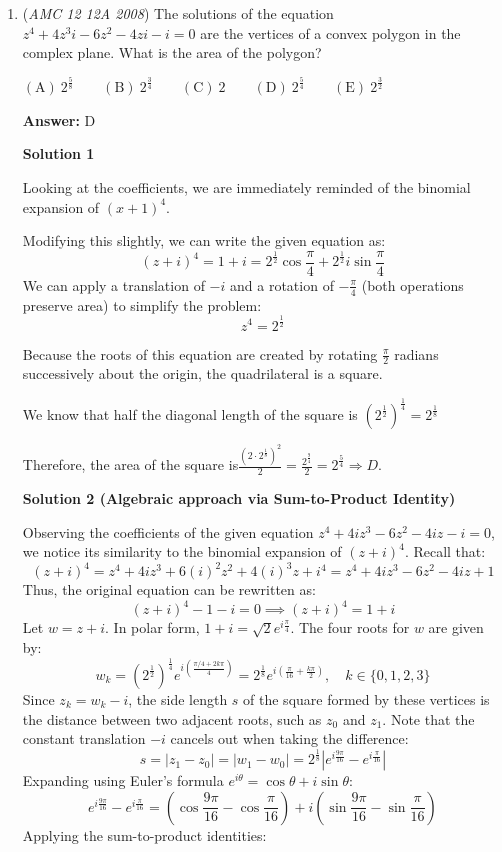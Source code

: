 \begin{enumerate}
	\item (\textit{AMC 12 12A 2008}) The solutions of the equation $z^4+4z^3i-6z^2-4zi-i=0$ are the vertices of a convex polygon in the complex plane. What is the area of the polygon?


 $\mathrm{(A)}\ 2^{\frac{5}{8}}\qquad\mathrm{(B)}\ 2^{\frac{3}{4}}\qquad\mathrm{(C)}\ 2\qquad\mathrm{(D)}\ 2^{\frac{5}{4}}\qquad\mathrm{(E)}\ 2^{\frac{3}{2}}$

 \textbf{Answer: }D



\textbf{Solution 1}

Looking at the coefficients, we are immediately reminded of the binomial expansion of ${\left(x+1\right)}^{4}$.

 Modifying this slightly, we can write the given equation as:
 \[{\left(z+i\right)}^{4}=1+i=2^{\frac{1}{2}}\cos \frac {\pi}{4} + 2^{\frac{1}{2}}i\sin \frac {\pi}{4}\]We can apply a translation of $-i$ and a rotation of $-\frac{\pi}{4}$ (both operations preserve area) to simplify the problem:
 \[z^{4}=2^{\frac{1}{2}}\]

 Because the roots of this equation are created by rotating $\frac{\pi}{2}$ radians successively about the origin, the quadrilateral is a square.

 We know that half the diagonal length of the square is ${\left(2^{\frac{1}{2}}\right)}^{\frac{1}{4}}=2^{\frac{1}{8}}$

 Therefore, the area of the square is$\frac{{\left( 2 \cdot 2^{\frac{1}{8}}\right)}^2}{2}=\frac{2^{\frac{9}{4}}}{2}=2^{\frac{5}{4}} \Rightarrow D.$




\textbf{Solution 2 (Algebraic approach via Sum-to-Product Identity)}

Observing the coefficients of the given equation $z^4 + 4iz^3 - 6z^2 - 4iz - i = 0$, we notice its similarity to the binomial expansion of $(z+i)^4$. Recall that:
 \[(z+i)^4 = z^4 + 4iz^3 + 6(i)^2z^2 + 4(i)^3z + i^4 = z^4 + 4iz^3 - 6z^2 - 4iz + 1\]Thus, the original equation can be rewritten as:
 \[(z+i)^4 - 1 - i = 0 \implies (z+i)^4 = 1+i\]Let $w = z+i$. In polar form, $1+i = \sqrt{2} e^{i\frac{\pi}{4}}$. The four roots for $w$ are given by:
 \[w_k = \left(2^{\frac{1}{2}}\right)^{\frac{1}{4}} e^{i\left(\frac{\pi/4 + 2k\pi}{4}\right)} = 2^{\frac{1}{8}} e^{i\left(\frac{\pi}{16} + \frac{k\pi}{2}\right)}, \quad k \in \{0, 1, 2, 3\}\]Since $z_k = w_k - i$, the side length $s$ of the square formed by these vertices is the distance between two adjacent roots, such as $z_0$ and $z_1$. Note that the constant translation $-i$ cancels out when taking the difference:
 \[s = |z_1 - z_0| = |w_1 - w_0| = 2^{\frac{1}{8}} \left| e^{i\frac{9\pi}{16}} - e^{i\frac{\pi}{16}} \right|\]Expanding using Euler's formula $e^{i\theta} = \cos\theta + i\sin\theta$:
 \[e^{i\frac{9\pi}{16}} - e^{i\frac{\pi}{16}} = \left( \cos\frac{9\pi}{16} - \cos\frac{\pi}{16} \right) + i \left( \sin\frac{9\pi}{16} - \sin\frac{\pi}{16} \right)\]Applying the sum-to-product identities:


\end{enumerate}
